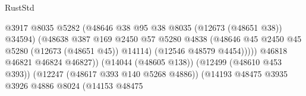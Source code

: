 \begin{lexlean}{RustStd}
\begin{coremodule}
{\begin{coremodule}
{{{{{{{{{{{{{{{{{{{{{{{{{{{{{{{{{{{{{{{{{{{{{{{{{{{{{{{{{{{{{{{{{{{{{{{{{{{{{{{{                                                          @3917
                                                          @8035
                                                          @5282
                                                          (@48646
                                                            @38
                                                            @95
                                                            @38
                                                            @8035
                                                            (@12673 (@48651 @38))
                                                            @34594)
                                                          (@48638
                                                            @387
                                                            @169
                                                            @2450
                                                            @57
                                                            @5280
                                                            @4838
                                                            (@48646
                                                              @45
                                                              @2450
                                                              @45
                                                              @5280
                                                              (@12673 (@48651 @45))
                                                              @14114)
                                                            (@12546 @48579 @4454)))))
                                                    @46818
                                                    @46821
                                                    @46824
                                                    @46827))
                                                (@14044 (@48605 @138))
                                                (@12499 (@48610 @453 @393))
                                                (@12247 (@48617 @393 @140 @5268 @4886))
                                                (@14193
                                                  @48475
                                                  @3935
                                                  @3926
                                                  @4886
                                                  @8024
                                                  (@14153
                                                    @48475
}}}}}}}}}}}}}}}}}}}}}}}}}}}}}}}}}}}}}}}}}}}}}}}}}}}}}}}}}}}}}}}}}}}}}}}}}}}}}}}}
\end{coremodule}}
\end{coremodule}
\end{lexlean}

